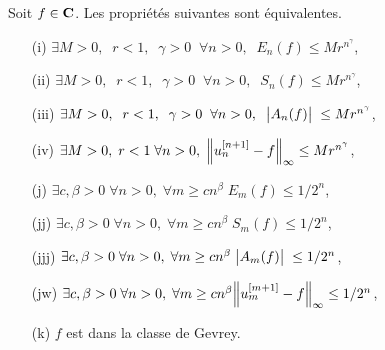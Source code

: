 \begin{ftheorem} \label{f524}
Soit $f \in {\bf C}$.  Les propriétés suivantes sont équivalentes. 
\begin{itemize}\itemsep2pt
\item [(i)] 
$ \exists M > 0, \; \; r < 1, \; \; \gamma > 0 \; \; 
\forall n> 0, \; \; E_n(f) \leq Mr^{n^{\gamma}}$,
\item [(ii)] 
$ \exists M > 0, \; \; r < 1, \; \; \gamma > 0 \; \; 
\forall n> 0, \; \; S_n(f) \leq Mr^{n^{\gamma}}$,
\item [(iii)] 
$ \exists M > 0, \; \; r < 1, \; \; \gamma > 0 \; \; 
\forall n> 0, \; \; \big|{A_n(f)}\big|\;  
 \leq Mr^{n^{\gamma}}$, 
\item [(iv)] 
$ \exists M > 0, \; r < 1 \; \forall n> 0, \; \Big\lVert  u_n^{[n+1]} - f  \Big\rVert_{\infty} \leq Mr^{n^{\gamma}}$,
\item [(j)] 
$ \exists c, \beta > 0 \; \forall n> 0,\; \forall m \geq cn^{\beta} 
\; E_m(f) \leq 1/2^n $,
\item [(jj)]
$ \exists c, \beta > 0 \; \forall n> 0,\; \forall m \geq cn^{\beta} \; S_m(f) \leq 1/2^n $,
\item [(jjj)] 
$ \exists c, \beta > 0 \; \forall n> 0,\; \forall m \geq cn^{\beta} \; 
\big|{A_m(f)}\big|\;  \leq 1/2^n $,
\item [(jw)] 
$ \exists c, \beta > 0 \; \forall n> 0,\;\forall m \geq cn^{\beta} \Big\lVert  u_m^{[m+1]} - f  \Big\rVert_{\infty} \leq 1/2^n $,
\item [(k)]  $f$ est dans la classe de Gevrey.
\end{itemize}
\end{ftheorem}

